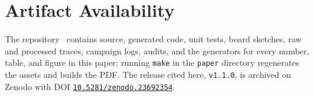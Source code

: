 \documentclass[conference]{IEEEtran}
\begin{document}
\section*{Artifact Availability}
The repository~\cite{qfabric2026} contains source, generated code, unit
tests, board sketches, raw and processed traces, campaign logs, audits, and
the generators for every number, table, and figure in this paper; running
\texttt{make} in the \texttt{paper} directory regenerates the assets and
builds the PDF. The release cited here, \texttt{v1.1.0}, is archived on Zenodo
with DOI \href{https://doi.org/10.5281/zenodo.23692354}{\texttt{10.5281/zenodo.23692354}}.



\end{document}

